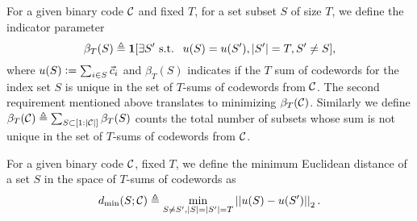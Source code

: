 
\begin{definition}
For a given binary code $\mathcal{C}$ and fixed $T$, for a set subset $S$ of size $T$, we define the indicator parameter
\[
\beta_T(S) \triangleq \mathbf{1}[\exists S' \text{ s.t. }~ u(S)= u(S'), |S'|=T,S'\neq S],
\]
where $u(S)\mathrel{\mathop:}= \sum_{i\in S}\vec{c}_i$ and $\beta_T(S)$ indicates if the $T$ sum of codewords for the index set $S$ is unique in the set of $T$-sums of codewords from $\mathcal{C}$. The second requirement mentioned above translates to minimizing $\beta_T(\mathcal{C})$. Similarly we define $\beta_T(\mathcal{C})\triangleq \sum_{S\subset [1:|\mathcal{C}|]}\beta_T(S)$ counts the total number of subsets whose sum is not unique in the set of $T$-sums of codewords from $\mathcal{C}$.
\label{Def:disjunctive_parameter_Tsum}
\end{definition}

\begin{definition}
For a given binary code $\mathcal{C}$, fixed $T$, we define the minimum Euclidean distance of a set $S$ in the space of  $T$-sums of codewords as
\[
d_{\mathrm{min}}(S;\mathcal{C})\triangleq \min_{S\neq S',|S|=|S'|=T} \left|\left| u(S)-u(S') \right|\right|_2.
\]
\label{Def:dmin_Tsum}
\end{definition}

